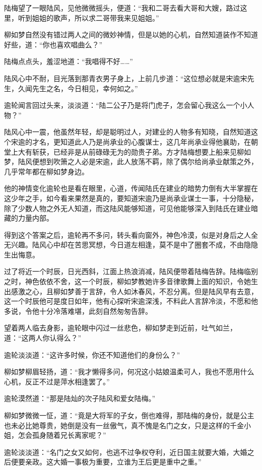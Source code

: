 陆梅望了一眼陆风，见他微微摇头，便道：“我和二哥去看大哥和大嫂，路过这里，听到姐姐的歌声，所以求二哥带我来见姐姐。”

柳如梦自然没有错过两人之间的微妙神情，但是以她的心机，自然知道装作不知道好些，道：“你也喜欢唱曲么？”

陆梅点点头，羞涩地道：“我唱得不好……”

陆风心中不耐，目光落到那青衣男子身上，上前几步道：“这位想必就是宋逾宋先生，久闻先生之名，今日相见，幸何如之。”

逾轮闻言回过头来，淡淡道：“陆二公子乃是将门虎子，怎会留心我这么一个小人物？”

陆风心中一震，他虽然年轻，却是聪明过人，对建业的人物多有知晓，自然知道这个宋逾的才名，更知道此人乃是尚承业的心腹谋士，这几年尚承业得他襄助，在朝堂上大有斩获，已经非是从前碌碌无为的勋贵子弟。方才陆梅想要上船来见柳如梦，陆风便想到吹箫之人必是宋逾，此人放荡不羁，除了偶尔给尚承业献策之外，几乎常年都在柳如梦身边。

他的神情变化逾轮也是看在眼里，心道，传闻陆氏在建业的暗势力倒有大半掌握在这少年之手，如今看来果然是真的，要知道宋逾乃是尚承业谋士一事，十分隐秘，除了少数人物之外无人知道，而这陆风能够知道，可见他能够深入到陆氏在建业暗藏的力量内部。

得到这个答案之后，逾轮再不多问，转头看向窗外，神色冷漠，似是对身后之人全无兴趣。陆风心中却在苦思冥想，今日道左相逢，莫不是中了圈套不成，不由隐隐生出悔意。

过了将近一个时辰，日光西斜，江面上热浪消减，陆风便带着陆梅告辞。陆梅临别之时，神色依依不舍，这一个时辰，柳如梦教她许多音律歌舞上面的知识，令她生出感激之心，且柳如梦善于言辞，令人如沐春风，不忍分离。但是陆风早有去意，这一个时辰他可是度日如年，他有心探听宋逾深浅，不料此人言辞冷淡，不愿和他多说，令他十分冷落难堪，此刻自然匆匆告辞。

望着两人临去身影，逾轮眼中闪过一丝悲色，柳如梦走到近前，吐气如兰，道：“这两人你认得么？”

逾轮淡淡道：“这许多时候，你还不知道他们的身份么？”

柳如梦柳眉轻扬，道：“我才懒得多问，何况这小姑娘温柔可人，我也不愿用什么心机，反正不过是萍水相逢罢了。”

逾轮漠然道：“那是陆灿的次子陆风和爱女陆梅。”

柳如梦微微一怔，道：“竟是大将军的子女，倒也难得，那陆梅的身份，就是公主也未必比她尊贵，她倒是没有一丝傲气，真不愧是名门之女，只是这样的千金小姐，怎会孤身随着兄长离家呢？”

逾轮淡淡道：“名门之女又如何，也逃不过争权夺利，近日国主就要大婚，大婚之后便要亲政。这大婚一事极为重要，立谁为王后更是重中之重。”

